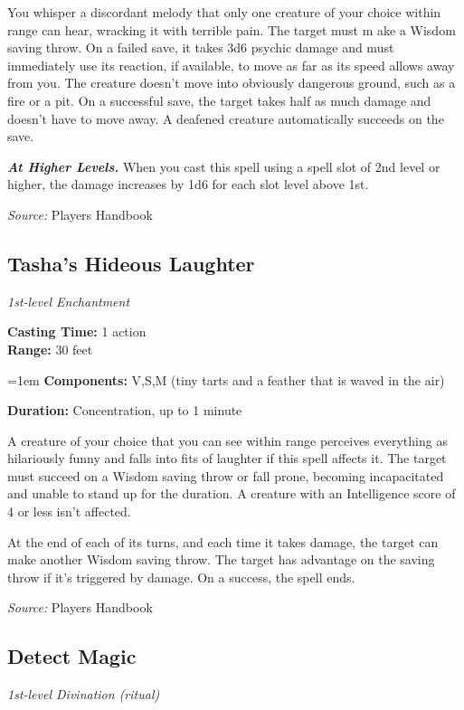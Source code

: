 \documentclass[10pt,twoside,twocolumn]{article}
\begin{document}
You whisper a discordant melody that only one creature of your choice within range can hear, wracking it with terrible pain. The target must m ake a Wisdom saving throw. On a failed save, it takes 3d6 psychic damage and must immediately use its reaction, if available, to move as far as its speed allows away from you. The creature doesn't move into obviously dangerous ground, such as a fire or a pit. On a successful save, the target takes half as much damage and doesn't have to move away. A deafened creature automatically succeeds on the save.



\textbf{\textit{At Higher Levels.}} When you cast this spell using a spell slot of 2nd level or higher, the damage increases by 1d6 for each slot level above 1st.


\textit{Source:} Players Handbook

\subsection{Tasha's Hideous Laughter}
\textit{1st-level Enchantment}
\smallskip

\noindent
\textbf{Casting Time:}  1 action\\
\textbf{Range:}  30 feet

\noindent
\hangindent=1em
\textbf{Components:}  V,S,M (tiny tarts and a feather that is waved in the air)

\noindent
\textbf{Duration:}  Concentration, up to 1 minute\\
\smallskip



A creature of your choice that you can see within range perceives everything as hilariously funny and falls into fits of laughter if this spell affects it. The target must succeed on a Wisdom saving throw or fall prone, becoming incapacitated and unable to stand up for the duration. A creature with an Intelligence score of 4 or less isn't affected.

At the end of each of its turns, and each time it takes damage, the target can make another Wisdom saving throw. The target has advantage on the saving throw if it's triggered by damage. On a success, the spell ends.



\textit{Source:} Players Handbook

\subsection{Detect Magic}
\textit{1st-level Divination (ritual)}
\smallskip
\end{document}
